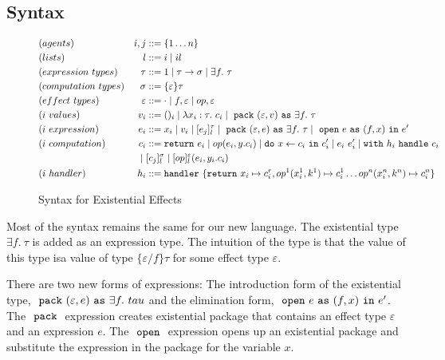 \subsection{Syntax}
\begin{figure}
\label{fig-syntax}
\begin{align*}
&(agents) &i, j &::= \{1 \dots n\}\\
&(lists) & l &::= i \mid il\\
&(expression\ types) &\tau &::= 1 \mid \tau \rightarrow \sigma \mid \exists f.\ \tau \\
&(computation\ types) &\sigma &::= \{\varepsilon\}\tau\\
&(effect\ types) &\varepsilon &::= \cdot \mid f, \varepsilon \mid op, \varepsilon\\
&(i\ values) &{v_i} &::= ()_i \mid \lambda x_i:\tau.\ c_i \mid \m{pack} (\varepsilon, v) \m{as} \exists f.\ \tau\\
&(i\ expression) &e_i &::= x_i \mid v_i \mid [e_j]^\tau_l \mid \m{pack} (\varepsilon, e) \m{as} \exists f.\ \tau  \mid \m{open} e \m{as} (f, x) \m{in} e'\\
&(i\ computation) &c_i &::= \texttt{return}\ e_i \mid op(e_i, y.c_i) \mid \texttt{do}\ x \leftarrow c_i\ \texttt{in}\ c_i' \mid e_i\ e_i' \mid \texttt{with}\ h_i\ \texttt{handle}\ c_i\\
 &\ &\mid\ &[c_j]^\sigma_l \mid [op]^\varepsilon_l (e_i, y_i.c_i)\\
&(i\ handler) &h_i &::= \texttt{handler}\ \{\texttt{return}\ x_i \mapsto c^r_i, op^1(x_i^1, k^1) \mapsto c_i^1 \dots  op^n(x_i^n, k^n) \mapsto c_i^n\}  
\end{align*}
\caption{Syntax for Existential Effects}
\end{figure}

Most of the syntax remains the same for our new language. The existential type $\exists f.\ \tau$ is added as an expression type. The intuition of the type is that the value of this type isa value of type $\{\varepsilon/f\}\tau$ for some effect type $\varepsilon$. 

There  are two new forms of expressions: The introduction form of the existential type, $\ \texttt{pack}\  (\varepsilon, e) \ \texttt{as}\  \exists f.\ tau$ and the elimination form, $\ \texttt{open}\  e \ \texttt{as}\  (f, x) \ \texttt{in}\  e'$. The $\ \texttt{pack}\ $ expression creates existential package that contains an effect type $\varepsilon$ and an expression $e$.  The $\ \texttt{open}\ $ expression opens up an existential package and substitute the expression in the package for the variable $x$.

